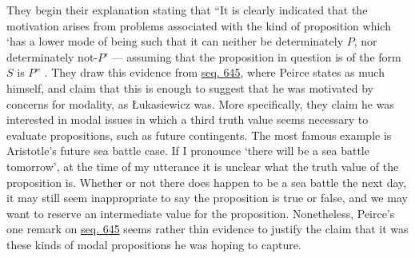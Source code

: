 They begin their explanation stating that ``It is clearly indicated that the motivation arises from problems associated with the kind of proposition which `has a lower mode of being such that it can neither be determinately $P$, nor determinately not-$P$' --- assuming that the proposition in question is of the form $S$ is $P$'' \citep[77]{fisch_peirces_1966}. They draw this evidence from \href{https://iiif.lib.harvard.edu/manifests/view/drs:15255301$645i}{seq. 645}, where Peirce states as much himself, and claim that this is enough to suggest that he was motivated by concerns for modality, as Łukasiewicz was. More specifically, they claim he was interested in modal issues in which a third truth value seems necessary to evaluate propositions, such as future contingents. The most famous example is Aristotle's future sea battle case. If I pronounce `there will be a sea battle tomorrow', at the time of my utterance it is unclear what the truth value of the proposition is. Whether or not there does happen to be a sea battle the next day, it may still seem inappropriate to say the proposition is true or false, and we may want to reserve an intermediate value for the proposition. Nonetheless, Peirce's one remark on \href{https://iiif.lib.harvard.edu/manifests/view/drs:15255301$645i}{seq. 645} seems rather thin evidence to justify the claim that it was these kinds of modal propositions he was hoping to capture.

